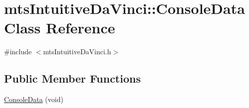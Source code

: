\hypertarget{classmts_intuitive_da_vinci_1_1_console_data}{}\section{mts\+Intuitive\+Da\+Vinci\+:\+:Console\+Data Class Reference}
\label{classmts_intuitive_da_vinci_1_1_console_data}


{\ttfamily \#include $<$mts\+Intuitive\+Da\+Vinci.\+h$>$}

\subsection*{Public Member Functions}
\begin{DoxyCompactItemize}
\item 
\hyperlink{classmts_intuitive_da_vinci_1_1_console_data_a7b3e663d83ad3cb5b899c4fd87e30bcd}{Console\+Data} (void)
\end{DoxyCompactItemize}
